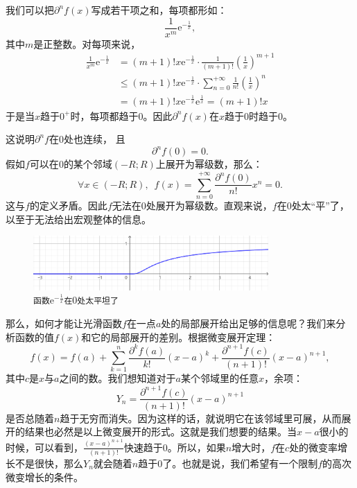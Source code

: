 \documentclass[12pt,UTF8]{ctexbook}
\begin{document}
\begin{appendix}
我们可以把$\partial^n f(x)$写成若干项之和，每项都形如：
$$ \frac{1}{x^m} \mathrm{e}^{-\frac{1}{x}},$$
其中$m$是正整数。对每项来说，
\begin{align*}
    \frac{1}{x^m} \mathrm{e}^{-\frac{1}{x}} &= (m+1)!x \mathrm{e}^{-\frac{1}{x}} \cdot \frac{1}{(m+1)!} \left(\frac{1}{x}\right)^{m+1} \\
    &\leqslant (m+1)!x \mathrm{e}^{-\frac{1}{x}} \cdot \sum_{n=0}^{+\infty} \frac{1}{n!} \left(\frac{1}{x}\right)^n \\
    &= (m+1)!x \mathrm{e}^{-\frac{1}{x}} \mathrm{e}^{\frac{1}{x}} = (m+1)!x
\end{align*}
于是当$x$趋于$0^+$时，每项都趋于$0$。因此$\partial^n f(x)$在$x$趋于$0$时趋于$0$。

这说明$\partial^n f$在$0$处也连续，
且
$$ \partial^n f(0) = 0.$$
假如$f$可以在$0$的某个邻域$(-R;R)$上展开为幂级数，那么：
$$ \forall x \in (-R;R) ,\,\,\, f(x) = \sum_{n=0}^{+\infty} \frac{\partial^n f(0)}{n!} x^n = 0. $$
这与$f$的定义矛盾。因此$f$无法在$0$处展开为幂级数。直观来说，$f$在$0$处太“平”了，以至于无法给出宏观整体的信息。

\begin{figure}[h] %
    \centering
    \includegraphics[width=0.8\textwidth]{tu/幂级数2.png}
    \caption*{\texttt{函数}$\displaystyle \mathrm{e}^{-\frac{1}{x}}$\texttt{在}$0$\texttt{处太平坦了}}
\end{figure}

那么，如何才能让光滑函数$f$在一点$a$处的局部展开给出足够的信息呢？我们来分析函数的值$f(x)$和它的局部展开的差别。根据微变展开定理：
$$ f(x) = f(a) + \sum_{k=1}^n \frac{\partial^k f (a)}{k!}(x - a)^k + \frac{\partial^{n+1} f (c)}{(n+1)!}(x - a)^{n+1}, $$
其中$c$是$x$与$a$之间的数。我们想知道对于$a$某个邻域里的任意$x$，余项：
$$ Y_n = \frac{\partial^{n+1} f (c)}{(n+1)!}(x - a)^{n+1} $$
是否总随着$n$趋于无穷而消失。因为这样的话，就说明它在该邻域里可展，从而展开的结果也必然是以上微变展开的形式。这就是我们想要的结果。当$x - a$很小的时候，可以看到，$\frac{(x - a)^{n+1}}{(n+1)!}$快速趋于$0$。所以，如果$n$增大时，$f$在$c$处的微变率增长不是很快，那么$Y_n$就会随着$n$趋于$0$了。也就是说，我们希望有一个限制$f$的高次微变增长的条件。


\end{appendix}
\end{document}
